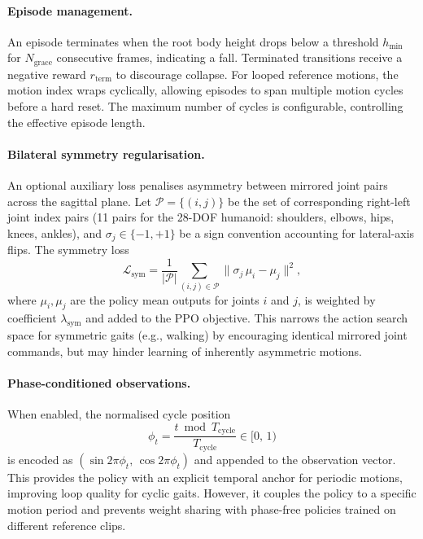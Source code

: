 \paragraph{Episode management.}
An episode terminates when the root body height drops below a threshold $h_{\min}$ for $N_{\mathrm{grace}}$ consecutive frames, indicating a fall. Terminated transitions receive a negative reward $r_{\mathrm{term}}$ to discourage collapse. For looped reference motions, the motion index wraps cyclically, allowing episodes to span multiple motion cycles before a hard reset. The maximum number of cycles is configurable, controlling the effective episode length.

\paragraph{Bilateral symmetry regularisation.}
An optional auxiliary loss penalises asymmetry between mirrored joint pairs across the sagittal plane. Let $\mathcal{P} = \{(i, j)\}$ be the set of corresponding right-left joint index pairs (11 pairs for the 28-DOF humanoid: shoulders, elbows, hips, knees, ankles), and $\sigma_j \in \{-1, +1\}$ be a sign convention accounting for lateral-axis flips. The symmetry loss
\[
    \mathcal{L}_{\mathrm{sym}} = \frac{1}{|\mathcal{P}|}\sum_{(i,j) \in \mathcal{P}} \|\sigma_j\, \mu_i - \mu_j\|^2,
\]
where $\mu_i, \mu_j$ are the policy mean outputs for joints $i$ and $j$, is weighted by coefficient $\lambda_{\mathrm{sym}}$ and added to the PPO objective. This narrows the action search space for symmetric gaits (e.g., walking) by encouraging identical mirrored joint commands, but may hinder learning of inherently asymmetric motions.

\paragraph{Phase-conditioned observations.}
When enabled, the normalised cycle position
\[
    \phi_t = \frac{t \bmod T_{\mathrm{cycle}}}{T_{\mathrm{cycle}}} \in [0,\, 1)
\]
is encoded as $(\sin 2\pi\phi_t,\, \cos 2\pi\phi_t)$ and appended to the observation vector. This provides the policy with an explicit temporal anchor for periodic motions, improving loop quality for cyclic gaits. However, it couples the policy to a specific motion period and prevents weight sharing with phase-free policies trained on different reference clips.
